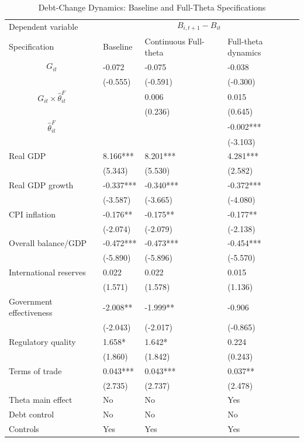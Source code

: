 \begin{table}[H]\centering
\begin{threeparttable}
\caption{Debt-Change Dynamics: Baseline and Full-Theta Specifications}
\label{tab:debt_change_combined_fulltheta}
\scriptsize
\begin{tabularx}{\textwidth}{lYYY}
\toprule
Dependent variable &  \\
\cmidrule(lr){2-4}
Specification & Baseline & Continuous Full-theta & Full-theta dynamics \\
\midrule
$$G_{it}$$ & -0.072 & -0.075 & -0.038 \\
 & (-0.555) & (-0.591) & (-0.300) \\
$$G_{it}\times\widehat{\theta}^{F}_{it}$$ &  & 0.006 & 0.015 \\
 &  & (0.236) & (0.645) \\
$$\widehat{\theta}^{F}_{it}$$ &  &  & -0.002*** \\
 &  &  & (-3.103) \\
Real GDP & 8.166*** & 8.201*** & 4.281*** \\
 & (5.343) & (5.530) & (2.582) \\
Real GDP growth & -0.337*** & -0.340*** & -0.372*** \\
 & (-3.587) & (-3.665) & (-4.080) \\
CPI inflation & -0.176** & -0.175** & -0.177** \\
 & (-2.074) & (-2.079) & (-2.138) \\
Overall balance/GDP & -0.472*** & -0.473*** & -0.454*** \\
 & (-5.890) & (-5.896) & (-5.570) \\
International reserves & 0.022 & 0.022 & 0.015 \\
 & (1.571) & (1.578) & (1.136) \\
Government effectiveness & -2.008** & -1.999** & -0.906 \\
 & (-2.043) & (-2.017) & (-0.865) \\
Regulatory quality & 1.658* & 1.642* & 0.224 \\
 & (1.860) & (1.842) & (0.243) \\
Terms of trade & 0.043*** & 0.043*** & 0.037** \\
 & (2.735) & (2.737) & (2.478) \\
\midrule
Theta main effect & No & No & Yes \\
Debt control & No & No & No \\
Controls & Yes & Yes & Yes \\

\end{tabularx}
\end{threeparttable}
\end{table}
